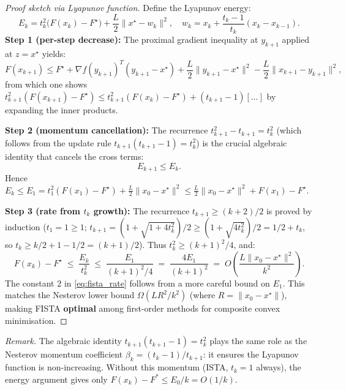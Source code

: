 \documentclass[11pt,a4paper]{article}
\theoremstyle{definition}
\begin{document}
\begin{proof}[Proof sketch via Lyapunov function]
Define the Lyapunov energy:
\begin{equation}
E_k = t_k^2\bigl(F(x_k) - F^{\star}\bigr) + \frac{L}{2}\|x^{\star} - w_k\|^2, \quad w_k = x_k + \frac{t_k - 1}{t_k}(x_k - x_{k-1}).
\label{eq:fista_lyapunov}
\end{equation}
\textbf{Step 1 (per-step decrease):} The proximal gradient inequality at $y_{k+1}$ applied at $z = x^{\star}$ yields:
\begin{equation}
F(x_{k+1}) \leq F^{\star} + \nabla f(y_{k+1})^T(y_{k+1} - x^{\star}) + \frac{L}{2}\|y_{k+1} - x^{\star}\|^2 - \frac{L}{2}\|x_{k+1} - y_{k+1}\|^2,
\end{equation}
from which one shows $t_{k+1}^2(F(x_{k+1}) - F^{\star}) \leq t_{k+1}^2(F(x_k) - F^{\star}) + (t_{k+1} - 1)[\ldots]$ by expanding the inner products.

\textbf{Step 2 (momentum cancellation):} The recurrence $t_{k+1}^2 - t_{k+1} = t_k^2$ (which follows from the update rule $t_{k+1}(t_{k+1}-1) = t_k^2$) is the crucial algebraic identity that cancels the cross terms:
\begin{equation}
E_{k+1} \leq E_k.
\end{equation}
Hence $E_k \leq E_1 = t_1^2(F(x_1) - F^{\star}) + \frac{L}{2}\|x_0 - x^{\star}\|^2 \leq \frac{L}{2}\|x_0 - x^{\star}\|^2 + F(x_1) - F^{\star}$.

\textbf{Step 3 (rate from $t_k$ growth):} The recurrence $t_{k+1} \geq (k+2)/2$ is proved by induction ($t_1 = 1 \geq 1$; $t_{k+1} = (1+\sqrt{1+4t_k^2})/2 \geq (1 + \sqrt{4t_k^2})/2 = 1/2 + t_k$, so $t_k \geq k/2 + 1 - 1/2 = (k+1)/2$). Thus $t_k^2 \geq (k+1)^2/4$, and:
\begin{equation}
F(x_k) - F^{\star} \;\leq\; \frac{E_k}{t_k^2} \;\leq\; \frac{E_1}{(k+1)^2/4} \;=\; \frac{4E_1}{(k+1)^2} \;=\; O\!\left(\frac{L\|x_0 - x^{\star}\|^2}{k^2}\right).
\end{equation}
The constant $2$ in \eqref{eq:fista_rate} follows from a more careful bound on $E_1$. This matches the Nesterov lower bound $\Omega(L R^2/k^2)$ (where $R = \|x_0 - x^{\star}\|$), making FISTA \textbf{optimal} among first-order methods for composite convex minimisation.
\end{proof}

\noindent\textit{Remark.} The algebraic identity $t_{k+1}(t_{k+1}-1) = t_k^2$ plays the same role as the Nesterov momentum coefficient $\beta_k = (t_k - 1)/t_{k+1}$: it ensures the Lyapunov function is non-increasing. Without this momentum (ISTA, $t_k = 1$ always), the energy argument gives only $F(x_k) - F^* \leq E_0/k = O(1/k)$.
\end{document}
